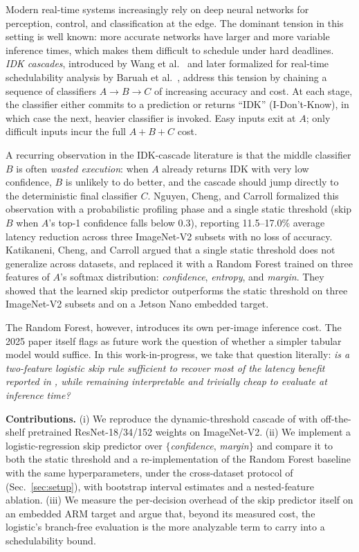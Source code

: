 \documentclass[conference]{IEEEtran}
\begin{document}
Modern real-time systems increasingly rely on deep neural networks for perception, control, and classification at the edge. The dominant tension in this setting is well known: more accurate networks have larger and more variable inference times, which makes them difficult to schedule under hard deadlines. \textit{IDK cascades}, introduced by Wang et al.\ \cite{wang2017idk} and later formalized for real-time schedulability analysis by Baruah et al.\ \cite{baruah2023optimal}, address this tension by chaining a sequence of classifiers $A \to B \to C$ of increasing accuracy and cost. At each stage, the classifier either commits to a prediction or returns ``IDK'' (I-Don't-Know), in which case the next, heavier classifier is invoked. Easy inputs exit at $A$; only difficult inputs incur the full $A+B+C$ cost.

A recurring observation in the IDK-cascade literature is that the middle classifier $B$ is often \textit{wasted execution}: when $A$ already returns IDK with very low confidence, $B$ is unlikely to do better, and the cascade should jump directly to the deterministic final classifier $C$. Nguyen, Cheng, and Carroll \cite{nguyen2024probabilistic} formalized this observation with a probabilistic profiling phase and a single static threshold (skip $B$ when $A$'s top-1 confidence falls below 0.3), reporting 11.5--17.0\% average latency reduction across three ImageNet-V2 subsets with no loss of accuracy. Katikaneni, Cheng, and Carroll \cite{katikaneni2025randomforest} argued that a single static threshold does not generalize across datasets, and replaced it with a Random Forest trained on three features of $A$'s softmax distribution: \textit{confidence}, \textit{entropy}, and \textit{margin}. They showed that the learned skip predictor outperforms the static threshold on three ImageNet-V2 subsets and on a Jetson Nano embedded target.

The Random Forest, however, introduces its own per-image inference cost. The 2025 paper itself flags as future work the question of whether a simpler tabular model would suffice. In this work-in-progress, we take that question literally: \textit{is a two-feature logistic skip rule sufficient to recover most of the latency benefit reported in \cite{katikaneni2025randomforest}, while remaining interpretable and trivially cheap to evaluate at inference time?}

\textbf{Contributions.} (i) We reproduce the dynamic-threshold cascade of \cite{nguyen2024probabilistic} with off-the-shelf pretrained ResNet-18/34/152 weights on ImageNet-V2. (ii) We implement a logistic-regression skip predictor over $\{$\textit{confidence}, \textit{margin}$\}$ and compare it to both the static threshold and a re-implementation of the Random Forest baseline with the same hyperparameters, under the cross-dataset protocol of \cite{katikaneni2025randomforest} (Sec.~\ref{sec:setup}), with bootstrap interval estimates and a nested-feature ablation. (iii) We measure the per-decision overhead of the skip predictor itself on an embedded ARM target and argue that, beyond its measured cost, the logistic's branch-free evaluation is the more analyzable term to carry into a schedulability bound.
\end{document}
